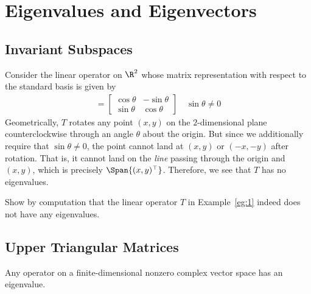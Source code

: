 \documentclass[thmcnt=section, color=blue, 12pt]{my-elegantbook}
\begin{document}

\chapter{Eigenvalues and Eigenvectors}


\section{Invariant Subspaces}


\begin{example} \label{eg:1}
    Consider the linear operator on $\R^2$ whose matrix representation with respect to the standard basis is given by 
    \begin{align*}
        [T] = \begin{bmatrix}
            \cos\theta & -\sin\theta \\ 
            \sin\theta & \cos\theta
        \end{bmatrix}
        \quad \sin\theta \neq 0
    \end{align*}
    Geometrically, $T$ rotates any point $(x, y)$ on the $2$-dimensional plane counterclockwise through an angle $\theta$ about the origin. But since we additionally require that $\sin\theta \neq 0$, the point cannot land at $(x, y)$ or $(-x, -y)$ after rotation. That is, it cannot land on the \textit{line} passing through the origin and $(x, y)$, which is precisely $\Span\{(x, y)^\top\}$. Therefore, we see that $T$ has no eigenvalues.
\end{example}

\begin{exercise}
    Show by computation that the linear operator $T$ in Example~\ref{eg:1} indeed does not have any eigenvalues.
\end{exercise}


\section{Upper Triangular Matrices}


\begin{theorem} \label{thm:2}
    Any operator on a finite-dimensional nonzero complex vector space has an eigenvalue.
\end{theorem}
\end{document}
